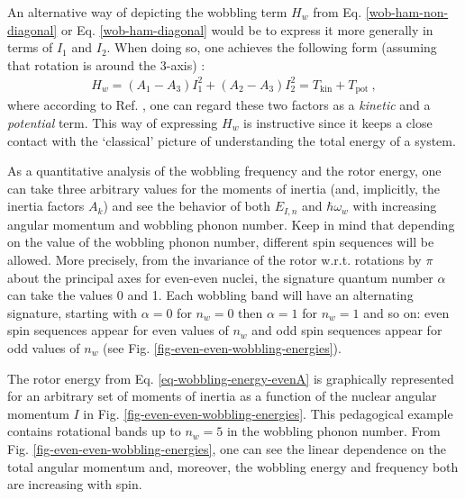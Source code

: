 An alternative way of depicting the wobbling term $H_w$ from Eq. \ref{wob-ham-non-diagonal} or Eq. \ref{wob-ham-diagonal} would be to express it more generally in terms of $I_1$ and $I_2$. When doing so, one achieves the following form (assuming that rotation is around the $3$-axis) \cite{oi2006semi}:
\begin{align}
    H_w=(A_1-A_3)I_1^2+(A_2-A_3)I_2^2=T_\text{kin}+T_\text{pot}\ ,
\end{align}
where according to Ref. \cite{wen2015wobbling}, one can regard these two factors as a \emph{kinetic} and a \emph{potential} term. This way of expressing $H_w$ is instructive since it keeps a close contact with the `classical' picture of understanding the total energy of a system.

As a quantitative analysis of the wobbling frequency and the rotor energy, one can take three arbitrary values for the moments of inertia (and, implicitly, the inertia factors $A_k$) and see the behavior of both $E_{I,n}$ and $\hbar\omega_w$ with increasing angular momentum and wobbling phonon number. Keep in mind that depending on the value of the wobbling phonon number, different spin sequences will be allowed. More precisely, from the invariance of the rotor w.r.t. rotations by $\pi$ about the principal axes for even-even nuclei, the signature quantum number $\alpha$ can take the values 0 and 1. Each wobbling band will have an alternating signature, starting with $\alpha=0$ for $n_w=0$ then $\alpha=1$ for $n_w=1$ and so on: even spin sequences appear for even values of $n_w$ and odd spin sequences appear for odd values of $n_w$ (see Fig. \ref{fig-even-even-wobbling-energies}).

The rotor energy from Eq. \ref{eq-wobbling-energy-evenA} is graphically represented for an arbitrary set of moments of inertia as a function of the nuclear angular momentum $I$ in Fig. \ref{fig-even-even-wobbling-energies}. This pedagogical example contains rotational bands up to $n_w=5$ in the wobbling phonon number. From Fig. \ref{fig-even-even-wobbling-energies}, one can see the linear dependence on the total angular momentum and, moreover, the wobbling energy and frequency both are increasing with spin.

